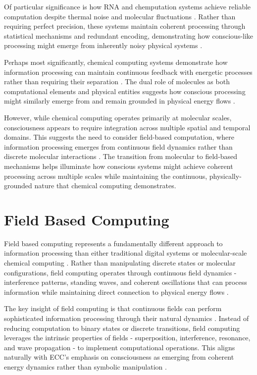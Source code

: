 \begin{refsection}
Of particular significance is how RNA and chemputation systems achieve reliable computation despite thermal noise and molecular fluctuations \cite{Benenson2019}. Rather than requiring perfect precision, these systems maintain coherent processing through statistical mechanisms and redundant encoding, demonstrating how conscious-like processing might emerge from inherently noisy physical systems \cite{Katz2012}.

Perhaps most significantly, chemical computing systems demonstrate how information processing can maintain continuous feedback with energetic processes rather than requiring their separation \cite{Lehn2013}. The dual role of molecules as both computational elements and physical entities suggests how conscious processing might similarly emerge from and remain grounded in physical energy flows \cite{Magnasco1997}.

However, while chemical computing operates primarily at molecular scales, consciousness appears to require integration across multiple spatial and temporal domains. This suggests the need to consider field-based computation, where information processing emerges from continuous field dynamics rather than discrete molecular interactions \cite{Prakash2007}. The transition from molecular to field-based mechanisms helps illuminate how conscious systems might achieve coherent processing across multiple scales while maintaining the continuous, physically-grounded nature that chemical computing demonstrates.

\section{Field Based Computing}

Field based computing represents a fundamentally different approach to information processing than either traditional digital systems or molecular-scale chemical computing \cite{Bandyopadhyay2020}. Rather than manipulating discrete states or molecular configurations, field computing operates through continuous field dynamics - interference patterns, standing waves, and coherent oscillations that can process information while maintaining direct connection to physical energy flows \cite{Calude2018b}.

The key insight of field computing is that continuous fields can perform sophisticated information processing through their natural dynamics \cite{Chua2017}. Instead of reducing computation to binary states or discrete transitions, field computing leverages the intrinsic properties of fields - superposition, interference, resonance, and wave propagation - to implement computational operations. This aligns naturally with ECC's emphasis on consciousness as emerging from coherent energy dynamics rather than symbolic manipulation \cite{Fromherz2019}.


\end{refsection}
